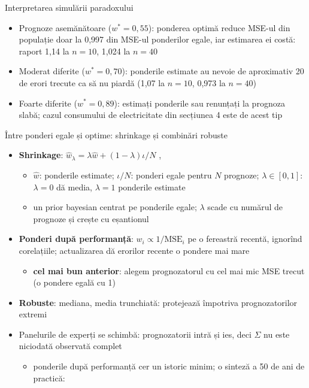 \begin{frame}{Interpretarea simulării paradoxului}
\itemsize{\small}
\begin{itemize}
    \item Prognoze asemănătoare ($w^* = 0{,}55$): ponderea optimă reduce MSE-ul din populație doar la 0{,}997 din MSE-ul ponderilor egale, iar estimarea ei costă: raport 1{,}14 la $n = 10$, 1{,}024 la $n = 40$
    \item Moderat diferite ($w^* = 0{,}70$): ponderile estimate au nevoie de aproximativ 20 de erori trecute ca să nu piardă (1{,}07 la $n = 10$, 0{,}973 la $n = 40$)
    \item Foarte diferite ($w^* = 0{,}89$): estimați ponderile sau renunțați la prognoza slabă; cazul consumului de electricitate din secțiunea 4 este de acest tip
\end{itemize}
\end{frame}

\begin{frame}{Între ponderi egale și optime: shrinkage și combinări robuste}
\itemsize{\small}
\begin{itemize}
    \item \textbf{Shrinkage}: $\hat w_\lambda = \lambda\hat w + (1 - \lambda)\iota/N$ , 
    \begin{itemize}
        \item $\hat w$: ponderile estimate; $\iota/N$: ponderi egale pentru $N$ prognoze; $\lambda \in [0,1]$: $\lambda = 0$ dă media, $\lambda = 1$ ponderile estimate
        \item un prior bayesian centrat pe ponderile egale; $\lambda$ scade cu numărul de prognoze și crește cu eșantionul
    \end{itemize}
    \item \textbf{Ponderi după performanță}: $w_i \propto 1/\mathrm{MSE}_i$ pe o fereastră recentă, ignorînd corelațiile; actualizarea dă erorilor recente o pondere mai mare
    \begin{itemize}
        \item \textbf{cel mai bun anterior}: alegem prognozatorul cu cel mai mic MSE trecut (o pondere egală cu 1)
    \end{itemize}
    \item \textbf{Robuste}: mediana, media trunchiată: protejează împotriva prognozatorilor extremi
    \item Panelurile de experți se schimbă: prognozatorii intră și ies, deci $\Sigma$ nu este niciodată observată complet 
    \begin{itemize}
        \item ponderile după performanță cer un istoric minim; o sinteză a 50 de ani de practică: 
    \end{itemize}
\end{itemize}
\end{frame}

